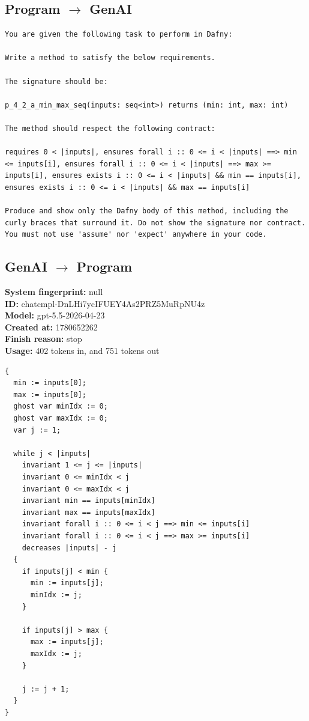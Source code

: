 \documentclass{article}
\begin{document}
\subsection*{Program $\rightarrow$ GenAI}
\begin{lstlisting}
You are given the following task to perform in Dafny:

Write a method to satisfy the below requirements.

The signature should be:

p_4_2_a_min_max_seq(inputs: seq<int>) returns (min: int, max: int)

The method should respect the following contract:

requires 0 < |inputs|, ensures forall i :: 0 <= i < |inputs| ==> min <= inputs[i], ensures forall i :: 0 <= i < |inputs| ==> max >= inputs[i], ensures exists i :: 0 <= i < |inputs| && min == inputs[i], ensures exists i :: 0 <= i < |inputs| && max == inputs[i]

Produce and show only the Dafny body of this method, including the curly braces that surround it. Do not show the signature nor contract. You must not use 'assume' nor 'expect' anywhere in your code.
\end{lstlisting}
\subsection*{GenAI $\rightarrow$ Program}
\textbf{System fingerprint: }null
\\\textbf{ID: }chatcmpl-DnLHi7ycIFUEY4As2PRZ5MuRpNU4z
\\\textbf{Model: }gpt-5.5-2026-04-23
\\\textbf{Created at: }1780652262
\\\textbf{Finish reason: }stop
\\\textbf{Usage: }402 tokens in, and 751 tokens out
\begin{lstlisting}
{
  min := inputs[0];
  max := inputs[0];
  ghost var minIdx := 0;
  ghost var maxIdx := 0;
  var j := 1;

  while j < |inputs|
    invariant 1 <= j <= |inputs|
    invariant 0 <= minIdx < j
    invariant 0 <= maxIdx < j
    invariant min == inputs[minIdx]
    invariant max == inputs[maxIdx]
    invariant forall i :: 0 <= i < j ==> min <= inputs[i]
    invariant forall i :: 0 <= i < j ==> max >= inputs[i]
    decreases |inputs| - j
  {
    if inputs[j] < min {
      min := inputs[j];
      minIdx := j;
    }

    if inputs[j] > max {
      max := inputs[j];
      maxIdx := j;
    }

    j := j + 1;
  }
}
\end{lstlisting}
\end{document}
